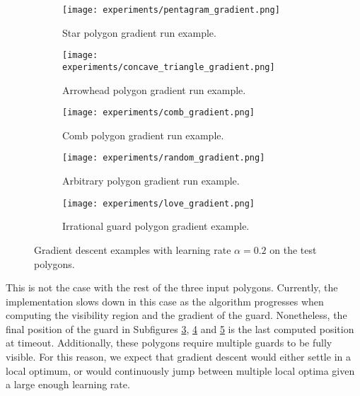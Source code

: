 \begin{figure}[h!]
    \centering
    \begin{subfigure}{0.45\textwidth}
        \centering
        \texttt{[image: experiments/pentagram\_gradient.png]}
        \caption{Star polygon gradient run example.}
        \label{fig:star_gradient}
    \end{subfigure}
    \begin{subfigure}{0.45\textwidth}
        \centering
        \texttt{[image: experiments/concave\_triangle\_gradient.png]}
        \caption{Arrowhead polygon gradient run example.}
        \label{fig:concave_gradient}
    \end{subfigure}
    \begin{subfigure}{0.45\textwidth}
        \centering
        \texttt{[image: experiments/comb\_gradient.png]}
        \caption{Comb polygon gradient run example.}
        \label{fig:comb_gradient}
    \end{subfigure}
    \begin{subfigure}{0.45\textwidth}
        \centering
        \texttt{[image: experiments/random\_gradient.png]}
        \caption{Arbitrary polygon gradient run example.}
        \label{fig:random_gradient}
    \end{subfigure}
    \begin{subfigure}{\textwidth}
        \centering
        \texttt{[image: experiments/love\_gradient.png]}
        \caption{Irrational guard polygon gradient example.}
        \label{fig:love_gradient}
    \end{subfigure}
    \caption{Gradient descent examples with learning rate $\alpha = 0.2$ on the test polygons.}
    \label{fig:gradients}
\end{figure}

This is not the case with the rest of the three input polygons. Currently, the implementation slows down in this case as the algorithm progresses when computing the visibility region and the gradient of the guard. Nonetheless, the final position of the guard in Subfigures \ref{fig:comb_gradient}, \ref{fig:random_gradient} and \ref{fig:love_gradient} is the last computed position at timeout. Additionally, these polygons require multiple guards to be fully visible. For this reason, we expect that gradient descent would either settle in a local optimum, or would continuously jump between multiple local optima given a large enough learning rate.

